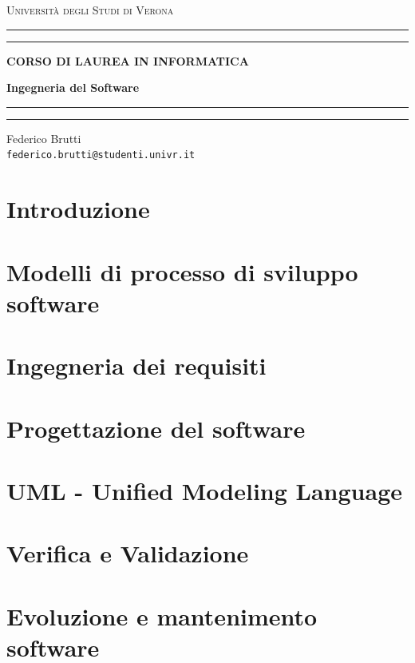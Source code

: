 \documentclass[12pt,a4paper,oneside]{book}
\begin{document}
	
	\begin{titlepage}
		\begin{center}
			{{\LARGE{\textsc{Università degli Studi di Verona}}}} \rule[0.1cm]{15.8cm}{0.1mm}
			\rule[0.5cm]{15.8cm}{0.6mm}
			{\small{\bf CORSO DI LAUREA IN INFORMATICA}}
		\end{center}
		\vspace{12.5mm}
		
		\begin{center}
			{\Huge{\bf Ingegneria del Software}}
		\end{center}
		\vspace{130mm}
		
		\begin{minipage}[l]{1.8mm}
			\rule[0.1cm]{0.1mm}{2cm}
			\rule[0.1cm]{0.6mm}{2cm}
		\end{minipage}
		\hspace{2mm}
		\begin{minipage}{10cm}	
			{\large{Federico Brutti\\
			\texttt{federico.brutti@studenti.univr.it}}}
		\end{minipage}
	\end{titlepage}
	
	\blankpage
	\tableofcontents
	
	\chapter{Introduzione}
	
	\chapter{Modelli di processo di sviluppo software}
	
	\chapter{Ingegneria dei requisiti}
	
	\chapter{Progettazione del software}
	
	\chapter{UML - Unified Modeling Language}
	
	\chapter{Verifica e Validazione}
	
	\chapter{Evoluzione e mantenimento software}
	
\end{document}
